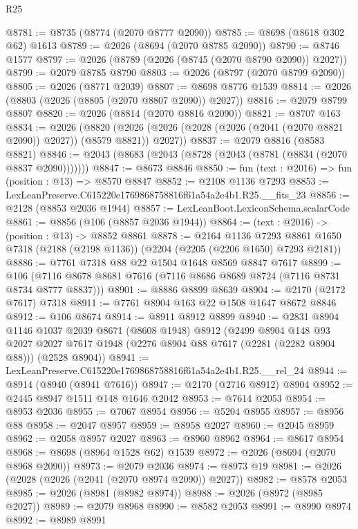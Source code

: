 \begin{lexlean}{R25}
\begin{coremodule}
@8781 := @8735 (@8774 (@2070 @8777 @2090))
@8785 := @8698 (@8618 @302 @62) @1613
@8789 := @2026 (@8694 (@2070 @8785 @2090))
@8790 := @8746 @1577
@8797 := @2026 (@8789 (@2026 (@8745 (@2070 @8790 @2090)) @2027))
@8799 := @2079 @8785 @8790
@8803 := @2026 (@8797 (@2070 @8799 @2090))
@8805 := @2026 (@8771 @2039)
@8807 := @8698 @8776 @1539
@8814 := @2026 (@8803 (@2026 (@8805 (@2070 @8807 @2090)) @2027))
@8816 := @2079 @8799 @8807
@8820 := @2026 (@8814 (@2070 @8816 @2090))
@8821 := @8707 @163
@8834 := @2026
    (@8820 (@2026 (@2026 (@2028 (@2026 (@2041 (@2070 @8821 @2090)) @2027)) (@8579 @8821)) @2027))
@8837 := @2079 @8816 (@8583 @8821)
@8846 := @2043 (@8683 (@2043 (@8728 (@2043 (@8781 (@8834 (@2070 @8837 @2090)))))))
@8847 := @8673 @8846
@8850 := fun (text : @2016) => fun (position : @13) => @8570 @8847
@8852 := @2108 @1136 @7293
@8853 := LexLeanPreserve.C615220e1769868758816f61a54a2e4b1.R25.__fits_23
@8856 := @2128 (@8853 @2036 @1944)
@8857 := LexLeanBoot.LexiconSchema.scalarCode
@8861 := @8856 (@106 (@8857 @2036 @1944))
@8864 := (text : @2016) -> (position : @13) -> @8852 @8861
@8878 := @2164
    @1136
    @7293
    @8861
    @1650
    @7318
    (@2188 (@2198 @1136))
    (@2204 (@2205 (@2206 @1650) @7293 @2181))
@8886 := @7761 @7318 @88 @22 @1504 @1648 @8569 @8847 @7617
@8899 := @106 (@7116 @8678 @8681 @7616 (@7116 @8686 @8689 @8724 (@7116 @8731 @8734 @8777 @8837)))
@8901 := @8886 @8899 @8639
@8904 := @2170 (@2172 @7617) @7318
@8911 := @7761 @8904 @163 @22 @1508 @1647 @8672 @8846
@8912 := @106 @8674
@8914 := @8911 @8912 @8899
@8940 := @2831
    @8904
    @1146
    @1037
    @2039
    @8671
    (@8608 @1948)
    @8912
    (@2499
      @8904
      @148
      @93
      @2027
      @2027
      @7617
      @1948
      (@2276 @8904 @88 @7617 (@2281 (@2282 @8904 @88)))
      (@2528 @8904))
@8941 := LexLeanPreserve.C615220e1769868758816f61a54a2e4b1.R25.__rel_24
@8944 := @8914 (@8940 (@8941 @7616))
@8947 := @2170 (@2716 @8912) @8904
@8952 := @2445 @8947 @1511 @148 @1646 @2042
@8953 := @7614 @2053
@8954 := @8953 @2036
@8955 := @7067 @8954
@8956 := @5204 @8955
@8957 := @8956 @88
@8958 := @2047 @8957
@8959 := @8958 @2027
@8960 := @2045 @8959
@8962 := @2058 @8957 @2027
@8963 := @8960 @8962
@8964 := @8617 @8954
@8968 := @8698 (@8964 @1528 @62) @1539
@8972 := @2026 (@8694 (@2070 @8968 @2090))
@8973 := @2079 @2036
@8974 := @8973 @19
@8981 := @2026 (@2028 (@2026 (@2041 (@2070 @8974 @2090)) @2027))
@8982 := @8578 @2053
@8985 := @2026 (@8981 (@8982 @8974))
@8988 := @2026 (@8972 (@8985 @2027))
@8989 := @2079 @8968
@8990 := @8582 @2053
@8991 := @8990 @8974
@8992 := @8989 @8991

\end{coremodule}
\end{lexlean}
